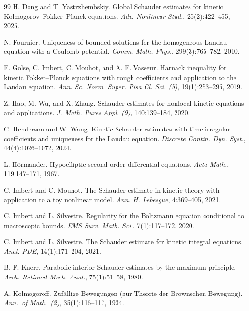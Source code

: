 \documentclass[11pt,reqno]{amsart}
\numberwithin{equation}{section}
\theoremstyle{remark}
\begin{document}
\begin{thebibliography}{99}
H. Dong and T. Yastrzhembskiy.
\newblock Global Schauder estimates for kinetic Kolmogorov--Fokker--Planck equations.
\newblock \emph{Adv. Nonlinear Stud.}, 25(2):422--455, 2025.

N. Fournier.
\newblock Uniqueness of bounded solutions for the homogeneous Landau equation with a Coulomb potential.
\newblock \emph{Comm. Math. Phys.}, 299(3):765--782, 2010.

F. Golse, C. Imbert, C. Mouhot, and A. F. Vasseur.
\newblock Harnack inequality for kinetic Fokker--Planck equations with rough coefficients and application to the Landau equation.
\newblock \emph{Ann. Sc. Norm. Super. Pisa Cl. Sci. (5)}, 19(1):253--295, 2019.

Z. Hao, M. Wu, and X. Zhang.
\newblock Schauder estimates for nonlocal kinetic equations and applications.
\newblock \emph{J. Math. Pures Appl. (9)}, 140:139--184, 2020.


C. Henderson and W. Wang.
\newblock Kinetic Schauder estimates with time-irregular coefficients and uniqueness for the Landau equation.
\newblock \emph{Discrete Contin. Dyn. Syst.}, 44(4):1026--1072, 2024.

L. H\"ormander.
\newblock Hypoelliptic second order differential equations.
\newblock \emph{Acta Math.}, 119:147--171, 1967.

C. Imbert and C. Mouhot.
\newblock The Schauder estimate in kinetic theory with application to a toy nonlinear model.
\newblock \emph{Ann. H. Lebesgue}, 4:369--405, 2021.

C. Imbert and L. Silvestre.
\newblock Regularity for the Boltzmann equation conditional to macroscopic bounds.
\newblock \emph{EMS Surv. Math. Sci.}, 7(1):117--172, 2020.

C. Imbert and L. Silvestre.
\newblock The Schauder estimate for kinetic integral equations.
\newblock \emph{Anal. PDE}, 14(1):171--204, 2021.

B. F. Knerr.
\newblock Parabolic interior Schauder estimates by the maximum principle.
\newblock \emph{Arch. Rational Mech. Anal.}, 75(1):51--58, 1980.

A. Kolmogoroff.
\newblock Zuf\"allige Bewegungen (zur Theorie der Brownschen Bewegung).
\newblock \emph{Ann.\ of Math.\ (2)}, 35(1):116--117, 1934.


\end{thebibliography}
\end{document}
